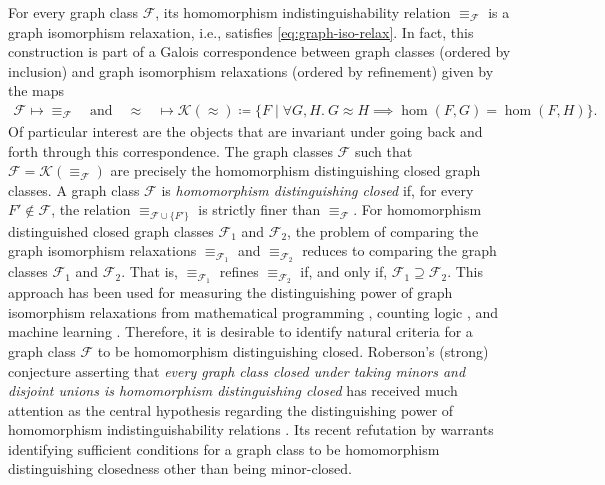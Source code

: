 \documentclass[11pt]{scrartcl}
\theoremstyle{definition}
\theoremstyle{plain}
\theoremstyle{remark}
\begin{document}
	For every graph class $\mathcal{F}$, its homomorphism indistinguishability relation $\equiv_{\mathcal{F}}$ is a graph isomorphism relaxation, i.e., satisfies \eqref{eq:graph-iso-relax}.
	In fact, this construction is part of a Galois correspondence between graph classes (ordered by inclusion) and graph isomorphism relaxations (ordered by refinement) given by the maps
	\begin{align}\label{eq:galois-hom}
		\mathcal{F} \mapsto {\equiv_{\mathcal{F}}} \quad \text{and}\quad 
		{\approx} &\mapsto \mathcal{K}({\approx}) \coloneqq \{F \mid \forall G, H.\ G \approx H \implies \hom(F, G) = \hom(F, H)\}.
	\end{align}
	Of particular interest are the objects that are invariant under going back and forth through this correspondence.
	The graph classes $\mathcal{F}$ such that $\mathcal{F} = \mathcal{K}(\equiv_{\mathcal{F}})$
	are precisely the homomorphism distinguishing closed  graph classes.
	A graph class $\mathcal{F}$ is \emph{homomorphism distinguishing closed} \cite{roberson_oddomorphisms_2022} if, for every $F' \not\in \mathcal{F}$,
	the relation $\equiv_{\mathcal{F} \cup \{F'\}}$ is strictly finer than $\equiv_{\mathcal{F}}$.
    For homomorphism distinguished closed graph classes $\mathcal{F}_1$ and $\mathcal{F}_2$,
    the problem of comparing the graph isomorphism relaxations $\equiv_{\mathcal{F}_1}$ and $\equiv_{\mathcal{F}_2}$ reduces to comparing the graph classes $\mathcal{F}_1$ and $\mathcal{F}_2$.
    That is, $\equiv_{\mathcal{F}_1}$ refines $\equiv_{\mathcal{F}_2}$ if, and only if, $\mathcal{F}_1 \supseteq \mathcal{F}_2$.
    This approach has been used for measuring the distinguishing power of graph isomorphism relaxations from mathematical programming \cite{roberson_lasserre_2024}, counting logic \cite{adler_going_2026,schindling_homomorphism_2025}, and machine learning \cite{gai_homomorphism_2025,zhang_beyond_2024}.
    Therefore, it is desirable to identify natural criteria for a graph class $\mathcal{F}$ to be homomorphism distinguishing closed.
	Roberson's (strong) conjecture \cite{roberson_oddomorphisms_2022} asserting that \emph{every graph class closed under taking minors and disjoint unions is homomorphism distinguishing closed} 
	has received much attention as the central hypothesis regarding the distinguishing power of homomorphism indistinguishability relations \cite{neuen_distinguishing_2026,jimenez_homomorphism_2026,kristjansson_oddomorphisms_2026}.
    Its recent refutation by \textcite{kristjansson_counterexamples_2026} warrants identifying sufficient conditions for a graph class to be homomorphism distinguishing closedness other than being minor-closed.
    
\end{document}
